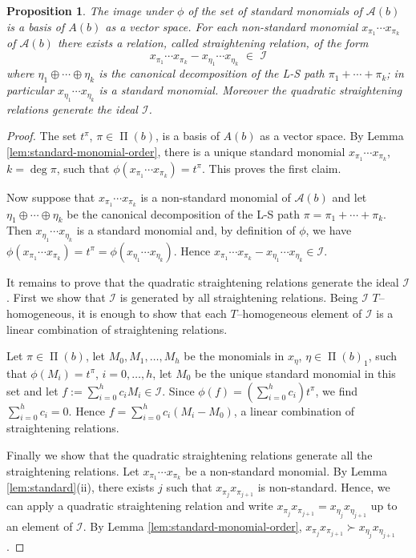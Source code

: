\documentclass[12pt, a4paper]{amsart}   	%
\numberwithin{equation}{section}
\theoremstyle{plain}
\newtheorem{proposition}[theorem]{Proposition}
\theoremstyle{definition}
\newcommand{\mcA}{{\mathcal A}}
\newcommand{\mcI}{{\mathcal I}}
\DeclareMathOperator{\LS}{\Pi}
\begin{document}
\begin{proposition}\label{prop:standard-monomials}
    The image under $\phi$ of the set of standard monomials of $\mcA(b)$ is a basis of $A(b)$ as a vector space. For each non-standard monomial $x_{\pi_1}\cdots x_{\pi_k}$ of $\mcA(b)$ there exists a relation, called \emph{straightening relation}, of the form
    \[
    x_{\pi_1}\cdots x_{\pi_k} - x_{\eta_1}\cdots x_{\eta_k}\,\,\in\,\,\mcI
    \]
    where $\eta_1 \oplus \cdots \oplus \eta_k$ is the canonical decomposition of the L-S path $\pi_1 + \cdots + \pi_k$; in particular $x_{\eta_1}\cdots x_{\eta_k}$ is a standard monomial. Moreover the quadratic straightening relations generate the ideal $\mcI$.
\end{proposition}
\begin{proof}
The set $t^\pi$, $\pi\in\LS(b)$, is a basis of $A(b)$ as a vector space. By Lemma \ref{lem:standard-monomial-order}, there is a unique standard monomial $x_{\pi_1}\cdots x_{\pi_k}$, $k = \deg\pi$, such that $\phi(x_{\pi_1}\cdots x_{\pi_k}) = t^\pi$. This proves the first claim.

Now suppose that $x_{\pi_1}\cdots x_{\pi_k}$ is a non-standard monomial of $\mcA(b)$ and let $\eta_1 \oplus \cdots \oplus \eta_k$ be the canonical decomposition of the L-S path $\pi = \pi_1 + \cdots + \pi_k$. Then $x_{\eta_1}\cdots x_{\eta_k}$ is a standard monomial and, by definition of $\phi$, we have $\phi(x_{\pi_1}\cdots x_{\pi_k}) = t^\pi = \phi(x_{\eta_1}\cdots x_{\eta_k})$. Hence $x_{\pi_1}\cdots x_{\pi_k} - x_{\eta_1}\cdots x_{\eta_k}\in\mcI$.

It remains to prove that the quadratic straightening relations generate the ideal $\mcI$. First we show that $\mcI$ is generated by all straightening relations. Being $\mcI$ $T$--homogeneous, it is enough to show that each $T$--homogeneous element of $\mcI$ is a linear combination of straightening relations.

Let $\pi\in\LS(b)$, let $M_0, M_1, \ldots, M_h$ be the monomials in $x_{\eta}$, $\eta\in\LS(b)_1$, such that $\phi(M_i) = t^\pi$, $i=0,\ldots,h$, let $M_0$ be the unique standard monomial in this set and let $f := \sum_{i=0}^h c_i M_i \in \mcI$. Since $\phi(f) = \left(\sum_{i = 0}^h c_i\right)t^\pi$, we find $\sum_{i = 0}^h c_i = 0$. Hence $f = \sum_{i=0}^h c_i (M_i - M_0)$, a linear combination of straightening relations.

Finally we show that the quadratic straightening relations generate all the straightening relations. Let $x_{\pi_1}\cdots x_{\pi_k}$ be a non-standard monomial. By Lemma \ref{lem:standard}(ii), there exists $j$ such that $x_{\pi_j}x_{\pi_{j+1}}$ is non-standard. Hence, we can apply a quadratic straightening relation and write $x_{\pi_j}x_{\pi_{j+1}} = x_{\eta_j}x_{\eta_{j+1}}$ up to an element of $\mcI$. By Lemma \ref{lem:standard-monomial-order}, $x_{\pi_j}x_{\pi_{j+1}} \succ x_{\eta_j}x_{\eta_{j+1}}$.


\end{proof}
\end{document}
